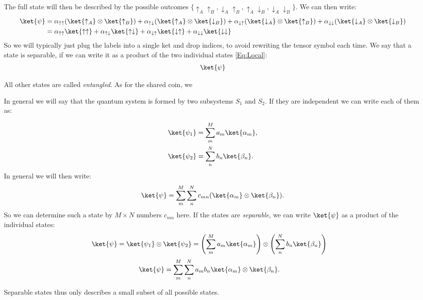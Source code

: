 The full state will then be described by the possible outcomes $\{\uparrow_A\uparrow_B,\downarrow_A\uparrow_B,\uparrow_A\downarrow_B, \downarrow_A\downarrow_B\}$. We can then write:
\begin{align}
\ket{\psi} &= \alpha_{\uparrow\uparrow}(\ket{\uparrow_A}\otimes\ket{\uparrow_B})+\alpha_{\uparrow\downarrow}(\ket{\uparrow_A}\otimes\ket{\downarrow_B})+\alpha_{\downarrow\uparrow}(\ket{\downarrow_A}\otimes\ket{\uparrow_B})+\alpha_{\downarrow\downarrow}(\ket{\downarrow_A}\otimes\ket{\downarrow_B})\\
&= \alpha_{\uparrow\uparrow}\ket{\uparrow\uparrow}+\alpha_{\uparrow\downarrow}\ket{\uparrow\downarrow}+\alpha_{\downarrow\uparrow}\ket{\downarrow \uparrow}+\alpha_{\downarrow\downarrow}\ket{\downarrow\downarrow}
\end{align}
So we will typically just plug the labels into a single ket and drop indices, to avoid rewriting the tensor symbol each time. We say that a state is separable, if we can write it as a product of the two individual states \eqref{Eq:Local}:
\begin{align}
\ket{\psi}
\end{align}

All other states are called \textit{entangled}. As for the shared coin, we


In general we will say that the quantum system is formed by two subsystems $S_1$ and $S_2$. If they are independent we can write each of them as:

\begin{align}
				\ket{\psi_1}&=\sum_m^M a_m \ket{\alpha_m},\\
				\ket{\psi_2}&=\sum_n^N b_n \ket{\beta_n}.
			
\end{align}
In general we will then write:
\begin{align}
\ket{\psi}=\sum_m^M \sum_n^N c_{mn}(\ket{\alpha_m}\otimes \ket{\beta_n}).
\end{align}
So we can determine such a state by $M \times N$ numbers $c_{mn}$ here.  If the states are \textit{separable}, we can write $\ket{\psi}$ as a product of the individual states:
\begin{align}
 \label{eq:psientangled} 
	\ket{\psi}	&=\ket{\psi_1}\otimes\ket{\psi_2}=\left(\sum_m^M a_m \ket{\alpha_m}\right) \otimes \left(\sum_n^N b_n \ket{\beta_n}\right)
\end{align}
\begin{align}
\ket{\psi}	&=\sum_m^M \sum_n^N a_m b_n \ket{\alpha_m} \otimes \ket{\beta_n}. \label{eq:psientangled3} 
\end{align}

Separable states thus only describes a small subset of all possible states. 